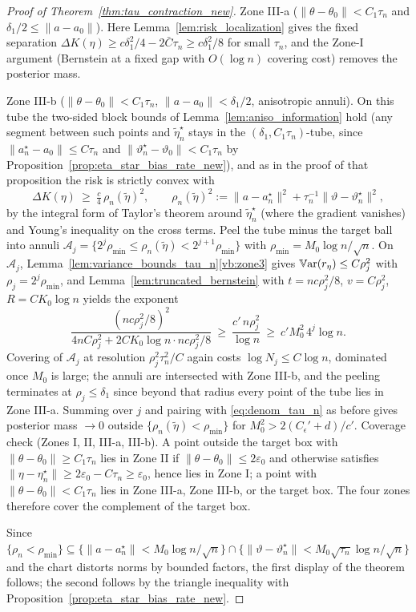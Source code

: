 \documentclass[11pt]{article}
\theoremstyle{definition}
\theoremstyle{plain}
\newcommand{\Var}{\mathbb{V}{\rm ar}}
\begin{document}
\begin{proof}[Proof of Theorem~\ref{thm:tau_contraction_new}]
Zone III-a ($\|\theta-\theta_0\|<C_1\tau_n$ and $\delta_1/2\le\|a-a_0\|$). Here Lemma~\ref{lem:risk_localization} gives the fixed separation $\Delta K(\eta)\ge c\delta_1^2/4-2\bar C\tau_n\ge c\delta_1^2/8$ for small $\tau_n$, and the Zone-I argument (Bernstein at a fixed gap with $O(\log n)$ covering cost) removes the posterior mass.

Zone III-b ($\|\theta-\theta_0\|<C_1\tau_n$, $\|a-a_0\|<\delta_1/2$, anisotropic annuli). On this tube the two-sided block bounds of Lemma~\ref{lem:aniso_information} hold (any segment between such points and $\tilde\eta_n^\star$ stays in the $(\delta_1,C_1\tau_n)$-tube, since $\|a_n^\star-a_0\|\le C\tau_n$ and $\|\vartheta_n^\star-\vartheta_0\|<C_1\tau_n$ by Proposition~\ref{prop:eta_star_bias_rate_new}), and as in the proof of that proposition the risk is strictly convex with
\[
\Delta K(\eta)\ \ge\ \tfrac{c}{4}\,\rho_n(\tilde\eta)^2,
\qquad
\rho_n(\tilde\eta)^2:=\|a-a_n^\star\|^2+\tau_n^{-1}\|\vartheta-\vartheta_n^\star\|^2,
\]
by the integral form of Taylor's theorem around $\tilde\eta_n^\star$ (where the gradient vanishes) and Young's inequality on the cross terms. Peel the tube minus the target ball into annuli
$\mathcal A_j=\{2^j\rho_{\min}\le\rho_n(\tilde\eta)<2^{j+1}\rho_{\min}\}$ with $\rho_{\min}=M_0\log n/\sqrt n$. On $\mathcal A_j$, Lemma~\ref{lem:variance_bounds_tau_n}\ref{vb:zone3} gives $\Var(r_\eta)\le C\rho_j^2$ with $\rho_j=2^j\rho_{\min}$, and Lemma~\ref{lem:truncated_bernstein} with $t=nc\rho_j^2/8$, $v=C\rho_j^2$, $R=CK_0\log n$ yields the exponent
\[
\frac{(nc\rho_j^2/8)^2}{4nC\rho_j^2+2CK_0\log n\cdot nc\rho_j^2/8}\ \ge\ \frac{c'\,n\rho_j^2}{\log n}
\ \ge\ c'M_0^2\,4^j\log n .
\]
Covering of $\mathcal A_j$ at resolution $\rho_j^2\tau_n^2/C$ again costs $\log N_j\le C\log n$, dominated once $M_0$ is large; the annuli are intersected with Zone III-b, and the peeling terminates at $\rho_j\le\delta_1$ since beyond that radius every point of the tube lies in Zone III-a. Summing over $j$ and pairing with \eqref{eq:denom_tau_n} as before gives posterior mass $\to0$ outside $\{\rho_n(\tilde\eta)<\rho_{\min}\}$ for $M_0^2>2(C_\epsilon'+d)/c'$. Coverage check (Zones I, II, III-a, III-b). A point outside the target box with $\|\theta-\theta_0\|\ge C_1\tau_n$ lies in Zone II if $\|\theta-\theta_0\|\le2\varepsilon_0$ and otherwise satisfies $\|\eta-\eta_n^\star\|\ge2\varepsilon_0-C\tau_n\ge\varepsilon_0$, hence lies in Zone I; a point with $\|\theta-\theta_0\|<C_1\tau_n$ lies in Zone III-a, Zone III-b, or the target box. The four zones therefore cover the complement of the target box.

Since $\{\rho_n<\rho_{\min}\}\subseteq\{\|a-a_n^\star\|<M_0\log n/\sqrt n\}\cap\{\|\vartheta-\vartheta_n^\star\|<M_0\sqrt{\tau_n}\log n/\sqrt n\}$ and the chart distorts norms by bounded factors, the first display of the theorem follows; the second follows by the triangle inequality with Proposition~\ref{prop:eta_star_bias_rate_new}.
\end{proof}
\end{document}
